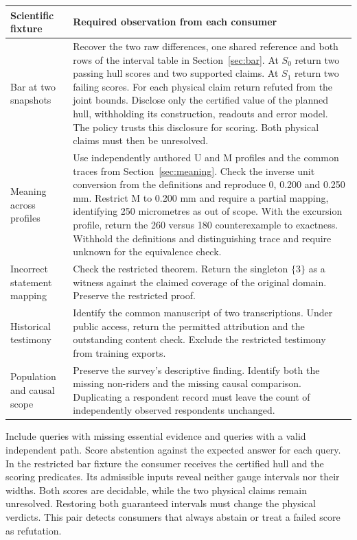 \documentclass[11pt,a4paper]{article}
\newcommand{\topic}[1]{\par\smallskip{\sffamily\bfseries\color{ink}#1\par}\nobreak}
\begin{document}
\small
\begin{tabularx}{\linewidth}{@{}L{.23\linewidth}Y@{}}
\toprule
\textbf{Scientific fixture} & \textbf{Required observation from each consumer} \\ \midrule
Bar at two snapshots & Recover the two raw differences, one shared reference and both rows of the interval table in Section~\ref{sec:bar}. At $S_0$ return two passing hull scores and two supported claims. At $S_1$ return two failing scores. For each physical claim return refuted from the joint bounds. Disclose only the certified value of the planned hull, withholding its construction, readouts and error model. The policy trusts this disclosure for scoring. Both physical claims must then be unresolved. \\
Meaning across profiles & Use independently authored U and M profiles and the common traces from Section~\ref{sec:meaning}. Check the inverse unit conversion from the definitions and reproduce 0, 0.200 and 0.250 mm. Restrict M to 0.200 mm and require a partial mapping, identifying 250 micrometres as out of scope. With the excursion profile, return the 260 versus 180 counterexample to exactness. Withhold the definitions and distinguishing trace and require unknown for the equivalence check. \\
Incorrect statement mapping & Check the restricted theorem. Return the singleton $\{3\}$ as a witness against the claimed coverage of the original domain. Preserve the restricted proof. \\
Historical testimony & Identify the common manuscript of two transcriptions. Under public access, return the permitted attribution and the outstanding content check. Exclude the restricted testimony from training exports. \\
Population and causal scope & Preserve the survey's descriptive finding. Identify both the missing non-riders and the missing causal comparison. Duplicating a respondent record must leave the count of independently observed respondents unchanged. \\
\bottomrule
\end{tabularx}
\normalsize

\topic{Scoring an abstention}
Include queries with missing essential evidence and queries with a valid independent path. Score abstention against the expected answer for each query. In the restricted bar fixture the consumer receives the certified hull and the scoring predicates. Its admissible inputs reveal neither gauge intervals nor their widths. Both scores are decidable, while the two physical claims remain unresolved. Restoring both guaranteed intervals must change the physical verdicts. This pair detects consumers that always abstain or treat a failed score as refutation.
\end{document}
